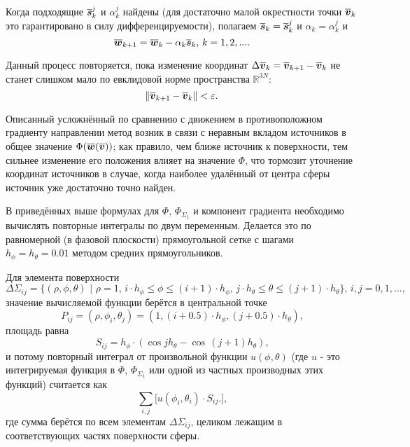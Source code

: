 Когда подходящие $\boldsymbol{\overline{s}}_k^j$ и $\alpha_k^j$ найдены (для достаточно малой окрестности точки $\boldsymbol{\overline{v}}_k$ это гарантировано в силу дифференцируемости), полагаем $\boldsymbol{\overline{s}}_k = \boldsymbol{\overline{s}}_k^j$ и $\alpha_k = \alpha_k^j$ и
\begin{equation}
\boldsymbol{\overline{w}}_{k+1} = \boldsymbol{\overline{w}}_{k} - \alpha_k \boldsymbol{\overline{s}}_k \text{, } k=1,2,... \text{.}
\end{equation}

Данный процесс повторяется, пока изменение координат $\Delta \boldsymbol{\overline{v}}_k = \boldsymbol{\overline{v}}_{k+1} - \boldsymbol{\overline{v}}_k$ не станет слишком мало по евклидовой норме пространства $\mathbb{R}^{3N}$:
\begin{equation}
\left\lVert \boldsymbol{\overline{v}}_{k+1} - \boldsymbol{\overline{v}}_{k} \right\lVert < \varepsilon \text{.}
\end{equation}

Описанный усложнённый по сравнению с движением в противоположном градиенту направлении метод возник в связи с неравным вкладом источников в общее значение $\Phi(\boldsymbol{\overline{w}}(\boldsymbol{\overline{v}}))$; как правило, чем ближе источник к поверхности, тем сильнее изменение его положения влияет на значение $\Phi$, что тормозит уточнение координат источников в случае, когда наиболее удалённый от центра сферы источник уже достаточно точно найден.

В приведённых выше формулах для $\Phi$, $\Phi_{\Sigma_1}$ и компонент градиента необходимо вычислять повторные интегралы по двум переменным. Делается это по равномерной (в фазовой плоскости) прямоугольной сетке с шагами $h_\phi = h_\theta = 0.01$ методом средних прямоугольников.

Для элемента поверхности
\begin{equation}
    \Delta \Sigma_{ij} = \lbrace (\rho, \phi, \theta)
    \text{ | }
    \rho = 1,\,
    i \cdot h_\phi \le \phi \le (i + 1) \cdot h_\phi,\,
    j \cdot h_\theta \le \theta \le (j + 1) \cdot h_\theta
    \rbrace
    \text{, }
    i,j=0,1,...\text{,}
\end{equation}
значение вычисляемой функции берётся в центральной точке
\begin{equation}
    P_{ij} = (\rho, \phi_i, \theta_j) = (1, (i + 0.5) \cdot h_\phi, (j + 0.5) \cdot h_\theta) \text{,}
\end{equation}
площадь равна
\begin{equation}
    S_{ij} = h_\phi \cdot (\cos j h_\theta - \cos\, (j + 1) h_\theta) \text{,}
\end{equation}
и потому повторный интеграл от произвольной функции $u(\phi, \theta)$ (где $u$ - это интегрируемая функция в $\Phi$, $\Phi_{\Sigma_1}$ или одной из частных производных этих функций) считается как
\begin{equation}
    \sum_{i, j}
    \big[
    u(\phi_i, \theta_i) \cdot S_{ij} \text{.}
    \big]
    \text{,}
\end{equation}
где сумма берётся по всем элементам $\Delta \Sigma_{ij}$, целиком лежащим в соответствующих частях поверхности сферы.

